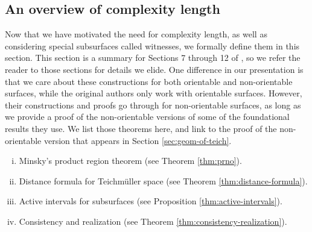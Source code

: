 


\subsection{An overview of complexity length}
\label{sec:an-overv-compl}

Now that we have motivated the need for complexity length, as well as considering special subsurfaces called witnesses, we formally define them in this section.
This section is a summary for Sections 7 through 12 of \textcite{dowdall2023lattice}, so we refer the reader to those sections for details we elide.
One difference in our presentation is that we care about these constructions for both orientable and non-orientable surfaces, while the original authors only work with orientable surfaces.
However, their constructions and proofs go through for non-orientable surfaces, as long as we provide a proof of the non-orientable versions of some of the foundational results they use.
We list those theorems here, and link to the proof of the non-orientable version that appears in Section \ref{sec:geom-of-teich}.
\begin{enumerate}[(i)]
\item Minsky's product region theorem (see Theorem \ref{thm:prno}).
\item Distance formula for Teichmüller space (see Theorem \ref{thm:distance-formula}).
\item Active intervals for subsurfaces (see Proposition \ref{thm:active-intervals}).
\item Consistency and realization (see Theorem \ref{thm:consistency-realization}).
\end{enumerate}

